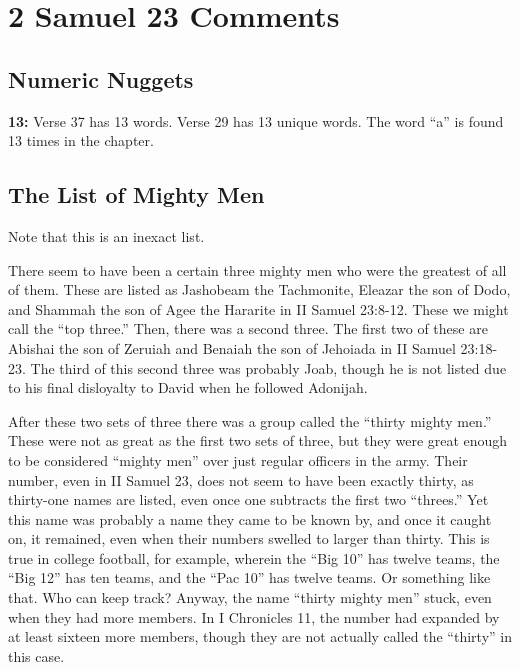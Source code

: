 \section{2 Samuel 23 Comments}

\subsection{Numeric Nuggets}
\textbf{13: } Verse 37 has 13 words. Verse 29 has 13 unique words. The word ``a'' is found 13 times in the chapter.

\subsection{The List of Mighty Men}
Note that this is an inexact list.

There seem to have been a certain three mighty men who were the greatest of all of them. These are listed as Jashobeam the Tachmonite, Eleazar the son of Dodo, and Shammah the son of Agee the Hararite in II Samuel 23:8-12. These we might call the “top three.” Then, there was a second three. The first two of these are Abishai the son of Zeruiah and Benaiah the son of Jehoiada in II Samuel 23:18-23. The third of this second three was probably Joab, though he is not listed due to his final disloyalty to David when he followed Adonijah.

After these two sets of three there was a group called the ``thirty mighty men.'' These were not as great as the first two sets of three, but they were great enough to be considered ``mighty men'' over just regular officers in the army. Their number, even in II Samuel 23, does not seem to have been exactly thirty, as thirty-one names are listed, even once one subtracts the first two ``threes.'' Yet this name was probably a name they came to be known by, and once it caught on, it remained, even when their numbers swelled to larger than thirty. This is true in college football, for example, wherein the ``Big 10'' has twelve teams, the ``Big 12” has ten teams, and the ``Pac 10'' has twelve teams. Or something like that. Who can keep track? Anyway, the name ``thirty mighty men'' stuck, even when they had more members. In I Chronicles 11, the number had expanded by at least sixteen more members, though they are not actually called the ``thirty'' in this case. \\

